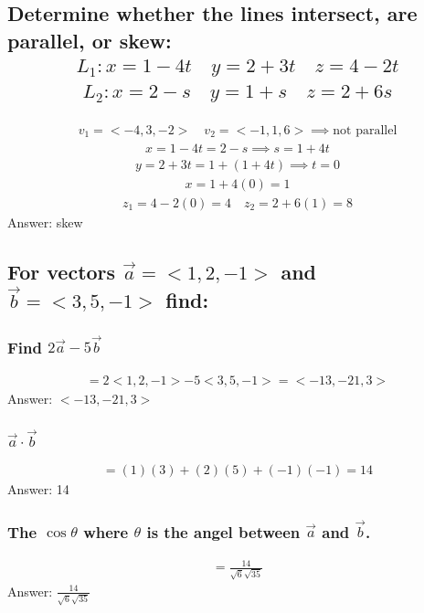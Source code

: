 \documentclass{article}
\begin{document}
\subsection{Determine whether the lines intersect, are parallel, or skew:
	\begin{align*}
		L_1: x = 1 - 4t \quad y = 2 + 3t \quad z = 4 - 2t
	\end{align*}
	\begin{align*}
		L_2: x = 2 - s \quad y = 1 + s \quad z = 2 + 6s
	\end{align*}
}
\begin{align*}
	v_1 = <-4, 3, -2> \quad v_2 = <-1, 1, 6> \implies \text{not parallel}
\end{align*}
\begin{align*}
	x = 1 - 4t = 2 - s \implies s = 1 + 4t
\end{align*}
\begin{align*}
	y = 2 + 3t = 1 + (1 + 4t) \implies t = 0
\end{align*}
\begin{align*}
	x = 1 + 4(0) = 1
\end{align*}
\begin{align*}
	z_1 = 4 - 2(0) = 4 \quad z_2 = 2 + 6(1) = 8
\end{align*}
Answer: skew


\subsection{For vectors $\vec{a} = <1, 2, -1>$ and $\vec{b} = <3, 5, -1>$ find:}
\subsubsection{Find $2\vec{a} - 5\vec{b}$}
\begin{align*}
	= 2<1, 2, -1> - 5<3, 5, -1> = <-13, -21, 3>
\end{align*}
Answer: $<-13, -21, 3>$

\subsubsection{$\vec{a} \cdot \vec{b}$}
\begin{align*}
	= (1)(3) + (2)(5) + (-1)(-1) = 14
\end{align*}
Answer: 14

\subsubsection{The $\cos{\theta}$ where $\theta$ is the angel between $\vec{a}$ and $\vec{b}$.}
\begin{align*}
	= \frac{14}{\sqrt{6}\sqrt{35}}
\end{align*}
Answer: $\frac{14}{\sqrt{6}\sqrt{35}}$
\end{document}
